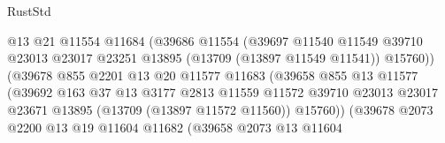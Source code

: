 \begin{lexlean}{RustStd}
\begin{coremodule}
                                      @13
                                      @21
                                      @11554
                                      @11684
                                      (@39686
                                        @11554
                                        (@39697
                                          @11540
                                          @11549
                                          @39710
                                          @23013
                                          @23017
                                          @23251
                                          @13895
                                          (@13709 (@13897 @11549 @11541))
                                          @15760))
                                      (@39678
                                        @855
                                        @2201
                                        @13
                                        @20
                                        @11577
                                        @11683
                                        (@39658
                                          @855
                                          @13
                                          @11577
                                          (@39692
                                            @163
                                            @37
                                            @13
                                            @3177
                                            @2813
                                            @11559
                                            @11572
                                            @39710
                                            @23013
                                            @23017
                                            @23671
                                            @13895
                                            (@13709 (@13897 @11572 @11560))
                                            @15760))
                                        (@39678
                                          @2073
                                          @2200
                                          @13
                                          @19
                                          @11604
                                          @11682
                                          (@39658
                                            @2073
                                            @13
                                            @11604

\end{coremodule}
\end{lexlean}
